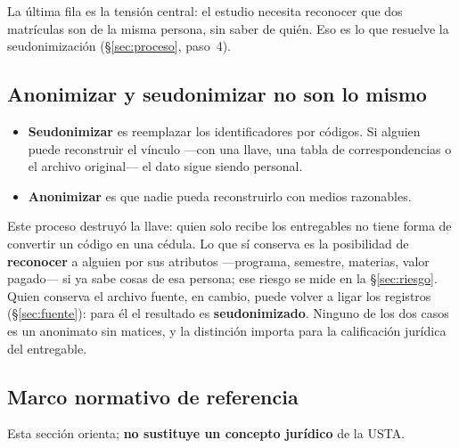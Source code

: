 \documentclass[11pt,a4paper,twoside,twocolumn]{article}
\begin{document}
La última fila es la tensión central: el estudio necesita reconocer que dos matrículas son de la
misma persona, sin saber de quién. Eso es lo que resuelve la seudonimización
(§\ref{sec:proceso}, paso~4).

\subsection{Anonimizar y seudonimizar no son lo mismo}\label{sec:anon-seud}

\begin{itemize}[leftmargin=*,itemsep=2pt,topsep=0pt]
  \item \textbf{Seudonimizar} es reemplazar los identificadores por códigos. Si alguien puede
  reconstruir el vínculo ---con una llave, una tabla de correspondencias o el archivo original---
  el dato sigue siendo personal.
  \item \textbf{Anonimizar} es que nadie pueda reconstruirlo con medios razonables.
\end{itemize}

Este proceso destruyó la llave: quien solo recibe los entregables no tiene forma de convertir un
código en una cédula. Lo que sí conserva es la posibilidad de \textbf{reconocer} a alguien por
sus atributos ---programa, semestre, materias, valor pagado--- si ya sabe cosas de esa persona;
ese riesgo se mide en la §\ref{sec:riesgo}. Quien conserva el archivo fuente, en cambio, puede
volver a ligar los registros (§\ref{sec:fuente}): para él el resultado es
\textbf{seudonimizado}. Ninguno de los dos casos es un anonimato sin matices, y la distinción
importa para la calificación jurídica del entregable.

\subsection{Marco normativo de referencia}

Esta sección orienta; \textbf{no sustituye un concepto jurídico} de la USTA.
\end{document}
